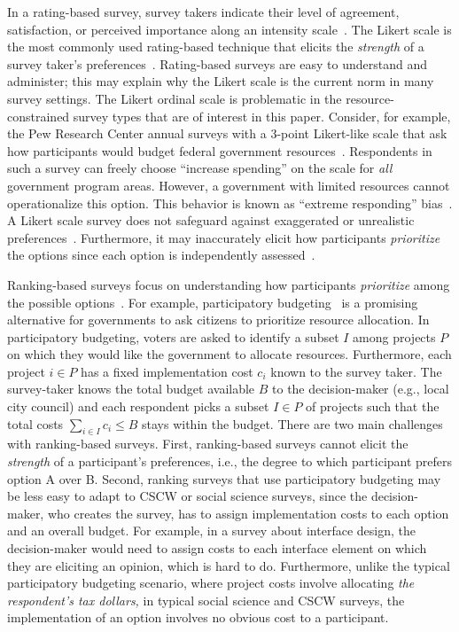 {{In a rating-based survey, survey takers indicate their level of agreement, satisfaction, or perceived importance along an intensity scale~\cite{moors2016two}. The Likert scale is the most commonly used rating-based technique that elicits the \textit{strength} of a survey taker's preferences~\cite{likert1932technique}. Rating-based surveys are easy to understand and administer; this may explain why the Likert scale is the current norm in many survey settings. The Likert ordinal scale is problematic in the resource-constrained survey types that are of interest in this paper. Consider, for example, the Pew Research Center annual surveys with a 3-point Likert-like scale that ask how participants would budget federal government resources~\cite{pew_spending}. Respondents in such a survey can freely choose  ``increase spending'' on the scale for \textit{all} government program areas. However, a government with limited resources cannot operationalize this option. This behavior is known as ``extreme responding'' bias~\cite{batchelor2016extreme, furnham1986response, meisenberg2008acquiescent}. A Likert scale survey does not safeguard against exaggerated or unrealistic preferences~\cite{araujo2017much, vavreck2007exaggerated}. Furthermore, it may inaccurately elicit how participants \textit{prioritize} the options since each option is independently assessed~\cite{alwin1985measurement}. 

Ranking-based surveys focus on understanding how participants \textit{prioritize} among the possible options~\cite{moors2016two}. For example, participatory budgeting~\cite{cabannes2004participatory,goel2015knapsack,Goel2016, Lee2014, benade2020preference} is a promising alternative for governments to ask citizens to prioritize resource allocation.  In participatory budgeting, voters are asked to identify a subset $I$ among projects $P$ on which they would like the government to allocate resources. Furthermore, each project $i \in P$ has a fixed implementation cost $c_i$ known to the survey taker. The survey-taker knows the total budget available $B$ to the decision-maker (e.g., local city council) and each respondent picks a subset $I \in P$ of projects such that the total costs $\sum_{i \in I} c_i \leqslant B$ stays within the budget. There are two main challenges with ranking-based surveys. First, ranking-based surveys cannot elicit the \textit{strength} of a participant's preferences, i.e., the degree to which participant prefers option A over B. Second, ranking surveys that use participatory budgeting may be less easy to adapt to CSCW or social science surveys, since the decision-maker, who creates the survey, has to assign implementation costs to each option and an overall budget. For example, in a survey about interface design, the decision-maker would need to assign costs to each interface element on which they are eliciting an opinion, which is hard to do. Furthermore, unlike the typical participatory budgeting scenario, where project costs involve allocating \textit{the respondent's tax dollars,} in typical social science and CSCW surveys, the implementation of an option involves no obvious cost to a participant. 

}}
